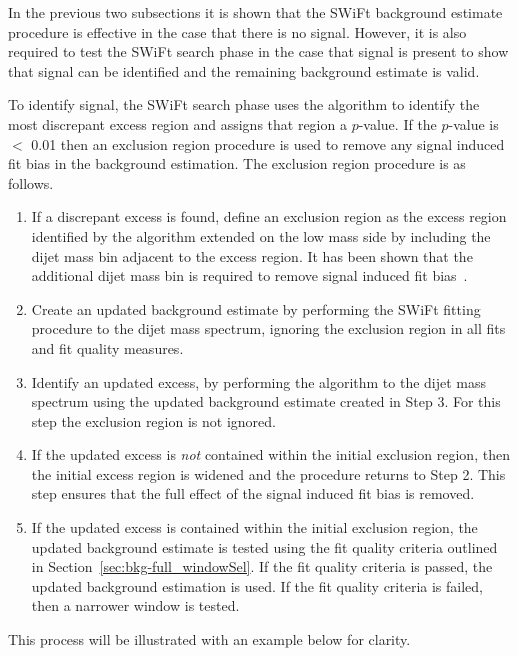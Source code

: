 In the previous two subsections it is shown that the SWiFt background estimate procedure is effective in the case that there is no signal.
However, it is also required to test the SWiFt search phase in the case that signal is present to show that signal can be identified and the remaining background estimate is valid.

To identify signal, the SWiFt search phase uses the \bh{} algorithm to identify the most discrepant excess region and assigns that region a \mbox{$p$-value}.
If the \mbox{$p$-value} is $<$ 0.01 then an exclusion region procedure is used to remove any signal induced fit bias in the background estimation.
The exclusion region procedure is as follows.
\vspace{-0.25em}
\begin{enumerate}[leftmargin=*]
\item If a discrepant excess is found, define an exclusion region as the excess region identified by the \bh{} algorithm
      extended on the low mass side by including the dijet mass bin adjacent to the excess region.
      It has been shown that the additional dijet mass bin is required to remove signal induced fit bias~\cite{dijet-mori16_paper}.
\item Create an updated background estimate 
      by performing the SWiFt fitting procedure to the dijet mass spectrum, ignoring the exclusion region in all fits and fit quality measures.
\item Identify an updated excess, by performing the \bh{} algorithm to the dijet mass spectrum using the updated background estimate created in Step 3.
      For this step the exclusion region is not ignored.
\item If the updated excess is \textit{not} contained within the initial exclusion region,
      then the initial excess region is widened and the procedure returns to Step 2.
      This step ensures that the full effect of the signal induced fit bias is removed.
\item If the updated excess is contained within the initial exclusion region,
      the updated background estimate is tested using the fit quality criteria outlined in Section~\ref{sec:bkg-full_windowSel}.
      If the fit quality criteria is passed, the updated background estimation is used.
      If the fit quality criteria is failed, then a narrower window is tested.
\end{enumerate}
\vspace{-0.25em}
This process will be illustrated with an example below for clarity.

